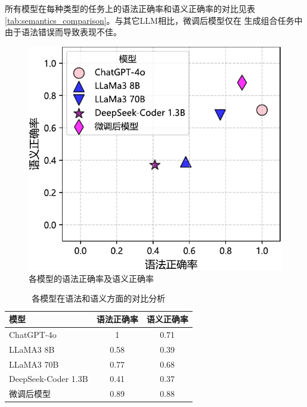 所有模型在每种类型的任务上的语法正确率和语义正确率的对比见表\ref{tab:semantics_comparison}。与其它LLM相比，微调后模型仅在
生成组合任务中由于语法错误而导致表现不佳。
\begin{figure}
    \centering
    \includegraphics{figures/synatics_and_semantics-crop.pdf}
    \caption{各模型的语法正确率及语义正确率}
    \label{fig:syntactics_and_semantics}
\end{figure}
\begin{table}
    \centering
    \begin{tabular}{lcc}
        \toprule
        \textbf{模型} & \textbf{语法正确率} & \textbf{语义正确率} \\
        \midrule
        ChatGPT-4o & 1 & 0.71 \\
        LLaMA3 8B & 0.58 & 0.39 \\
        LLaMA3 70B & 0.77 & 0.68 \\
        DeepSeek-Coder 1.3B & 0.41 & 0.37 \\
        \midrule
        微调后模型 & 0.89 & 0.88 \\
        \bottomrule
    \end{tabular}
    \caption{各模型在语法和语义方面的对比分析}
    \label{fig:overall_syntactics_semantics}
\end{table}
